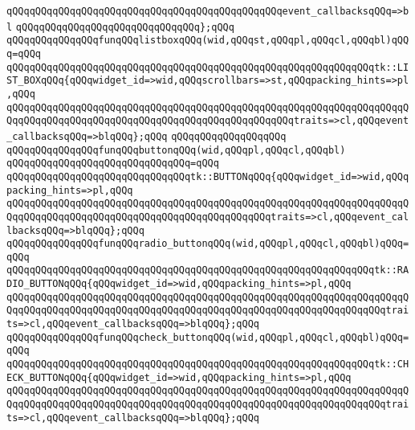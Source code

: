 \verb|qQQqqQQqqQQqqQQqqQQqqQQqqQQqqQQqqQQqqQQqqQQqqQQqevent_callbacksqQQq=>bl|\newline
\verb|qQQqqQQqqQQqqQQqqQQqqQQqqQQqqQQq};qQQq|\newline
\newline
\verb|qQQqqQQqqQQqqQQqfunqQQqlistboxqQQq(wid,qQQqst,qQQqpl,qQQqcl,qQQqbl)qQQq=qQQq|\newline
\verb|qQQqqQQqqQQqqQQqqQQqqQQqqQQqqQQqqQQqqQQqqQQqqQQqqQQqqQQqqQQqqQQqtk::LIST_BOXqQQq{qQQqwidget_id=>wid,qQQqscrollbars=>st,qQQqpacking_hints=>pl,qQQq|\newline
\verb|qQQqqQQqqQQqqQQqqQQqqQQqqQQqqQQqqQQqqQQqqQQqqQQqqQQqqQQqqQQqqQQqqQQqqQQqqQQqqQQqqQQqqQQqqQQqqQQqqQQqqQQqqQQqqQQqqQQqqQQqtraits=>cl,qQQqevent_callbacksqQQq=>blqQQq};qQQq|\newline
\verb|qQQqqQQqqQQqqQQqqQQq|\newline
\verb|qQQqqQQqqQQqqQQqfunqQQqbuttonqQQq(wid,qQQqpl,qQQqcl,qQQqbl)|\newline
\verb|qQQqqQQqqQQqqQQqqQQqqQQqqQQqqQQq=qQQq|\newline
\verb|qQQqqQQqqQQqqQQqqQQqqQQqqQQqqQQqtk::BUTTONqQQq{qQQqwidget_id=>wid,qQQqpacking_hints=>pl,qQQq|\newline
\verb|qQQqqQQqqQQqqQQqqQQqqQQqqQQqqQQqqQQqqQQqqQQqqQQqqQQqqQQqqQQqqQQqqQQqqQQqqQQqqQQqqQQqqQQqqQQqqQQqqQQqqQQqqQQqqQQqqQQqtraits=>cl,qQQqevent_callbacksqQQq=>blqQQq};qQQq|\newline
\newline
\verb|qQQqqQQqqQQqqQQqfunqQQqradio_buttonqQQq(wid,qQQqpl,qQQqcl,qQQqbl)qQQq=qQQq|\newline
\verb|qQQqqQQqqQQqqQQqqQQqqQQqqQQqqQQqqQQqqQQqqQQqqQQqqQQqqQQqqQQqqQQqtk::RADIO_BUTTONqQQq{qQQqwidget_id=>wid,qQQqpacking_hints=>pl,qQQq|\newline
\verb|qQQqqQQqqQQqqQQqqQQqqQQqqQQqqQQqqQQqqQQqqQQqqQQqqQQqqQQqqQQqqQQqqQQqqQQqqQQqqQQqqQQqqQQqqQQqqQQqqQQqqQQqqQQqqQQqqQQqqQQqqQQqqQQqqQQqqQQqtraits=>cl,qQQqevent_callbacksqQQq=>blqQQq};qQQq|\newline
\verb|qQQqqQQqqQQqqQQqfunqQQqcheck_buttonqQQq(wid,qQQqpl,qQQqcl,qQQqbl)qQQq=qQQq|\newline
\verb|qQQqqQQqqQQqqQQqqQQqqQQqqQQqqQQqqQQqqQQqqQQqqQQqqQQqqQQqqQQqqQQqtk::CHECK_BUTTONqQQq{qQQqwidget_id=>wid,qQQqpacking_hints=>pl,qQQq|\newline
\verb|qQQqqQQqqQQqqQQqqQQqqQQqqQQqqQQqqQQqqQQqqQQqqQQqqQQqqQQqqQQqqQQqqQQqqQQqqQQqqQQqqQQqqQQqqQQqqQQqqQQqqQQqqQQqqQQqqQQqqQQqqQQqqQQqqQQqqQQqtraits=>cl,qQQqevent_callbacksqQQq=>blqQQq};qQQq|\newline
